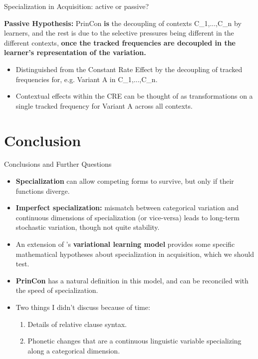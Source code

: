 \documentclass[hyperref={pdfpagelabels=false}]{beamer}
\begin{document}
\begin{frame}{Specialization in Acquisition: active or passive?}
		
		\textbf{Passive Hypothesis:} PrinCon \textbf{is} the decoupling of contexts C_1,...,C_n by learners, and the rest is due to the selective pressures being different in the different contexts, \textbf{once the tracked frequencies are decoupled in the learner's representation of the variation.}
		\begin{itemize}
			\item Distinguished from the Constant Rate Effect by the decoupling of tracked frequencies for, e.g. Variant A in C_1,...,C_n.
			\item Contextual effects within the CRE can be thought of as transformations on a single tracked frequency for Variant A across all contexts.
		\end{itemize}
\end{frame}







\section{Conclusion}

\begin{frame}{Conclusions and Further Questions}
		\begin{itemize}
			\item \textbf{Specialization} can allow competing forms to survive, but only if their functions diverge.
			\item \textbf{Imperfect specialization:} mismatch between categorical variation and continuous dimensions of specialization (or vice-versa) leads to long-term stochastic variation, though not quite stability.
			\item An extension of \citet{yang2000,yang2002}'s \textbf{variational learning model} provides some specific mathematical hypotheses about specialization in acquisition, which we should test.
			\item \textbf{PrinCon} has a natural definition in this model, and can be reconciled with the speed of specialization.
			\item Two things I didn't discuss because of time:
			\begin{enumerate}
				\item Details of relative clause syntax.
				\item Phonetic changes that are a continuous linguistic variable specializing along a categorical dimension.
			\end{enumerate}
		\end{itemize}
\end{frame}
\end{document}
